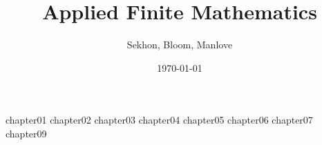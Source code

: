 \documentclass[12pt]{book}
\begin{document}

\frontmatter
\title{Applied Finite Mathematics}
\author{Sekhon, Bloom, Manlove}
\date{\today}
\maketitle
\tableofcontents

\mainmatter
{chapter01}
{chapter02}
{chapter03}
{chapter04}
{chapter05}
{chapter06}
{chapter07}
{chapter09}


\backmatter
\end{document}
